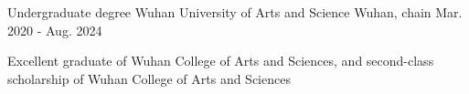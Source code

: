 

\begin{cventries}

  \cventry
    {Undergraduate degree} %
    {Wuhan University of Arts and Science} %
    {Wuhan, chain} %
    {Mar. 2020 - Aug. 2024} %
    {
      \begin{cvitems} %
        \item {Excellent graduate of Wuhan College of Arts and Sciences, and second-class scholarship of Wuhan College of Arts and Sciences}
      \end{cvitems}
    }

\end{cventries}

